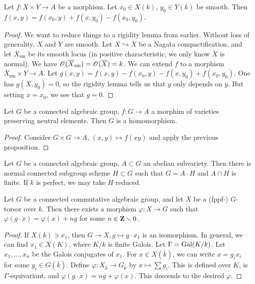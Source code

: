 \begin{prop}
Let $f:X\times Y\to A$ be a morphism. Let $x_0\in X(k)$, $y_0\in Y(k)$ be 
smooth. Then $f(x,y)=f(x_0,y) + f(x,y_0) - f(x_0,y_0)$. 
\end{prop}
\begin{proof}
We want to reduce things to a rigidity lemma from earlier. Without loss of 
generality, $X$ and $Y$ are smooth. Let 
$X\hookrightarrow \overline X$ be a Nagata compactification, and let 
$\overline{X}_\mathrm{sm}$ be its smooth locus (in positive characteristic, 
we only know $\overline X$ is normal). We have 
$\mathscr{O}(\overline X_\mathrm{sm}) = \mathscr{O}(\overline X)=k$. We can extend $f$ to a 
morphism $\overline X_\mathrm{sm} \times Y \to A$. Let 
$g(x,y) = f(x,y)-f(x_0,y)-f(x,y_0) + f(x_0,y_0)$. One has 
$g(X,y_0) = 0$, so the rigidity lemma tells us that $g$ only depends on $y$. 
But setting $x=x_0$, we see that $g=0$. 
\end{proof}

\begin{coro}
Let $G$ be a connected algebraic group, $f:G\to A$ a morphim of varieties 
preserving neutral elements. Then $G$ is a homomorphism. 
\end{coro}
\begin{proof}
Consider $G\times G\to A$, $(x,y)\mapsto f(x y)$ and apply the previous 
proposition. 
\end{proof}

\begin{theo}[Rosenlicht]
Let $G$ be a connected algebraic group, $A\subset G$ an abelian subvariety. Then 
there is normal connected subgroup scheme $H\subset G$ such that 
$G=A\cdot H$ and $A\cap H$ is finite. If $k$ is perfect, we may take $H$ 
reduced. 
\end{theo}

\begin{prop}
Let $G$ be a connected commutative algebraic group, and let $X$ be a (fppf-) 
$G$-torsor over $k$. Then there exists a morphism 
$\varphi:X\to G$ such that $\varphi(g\cdot x)=\varphi(x)+n g$ for some 
$n\in \mathbf{Z}\smallsetminus 0$. 
\end{prop}
\begin{proof}
If $X(k) \ni x_1$, then $G\to X,g\mapsto g\cdot x_1$ is an isomorphism. In 
general, we can find $x_1\in X(K)$, where $K/k$ is finite Galois. Let 
$\Gamma=\operatorname{Gal}(K/k)$. Let $x_1,\dots,x_n$ be the Galois conjugates of $x_1$. 
For $x\in X(\bar k)$, we can write $x=g_i x_i$ for some $g_i\in G(\bar k)$. 
Define $\varphi:X_{\bar k} \to G_{\bar k}$ by $x\mapsto \sum g_i$. This is 
defined over $K$, is $\Gamma$-equivariant, and 
$\varphi(g\cdot x)=n g+ \varphi(x)$. This descends to the desired $\varphi$. 
\end{proof}

